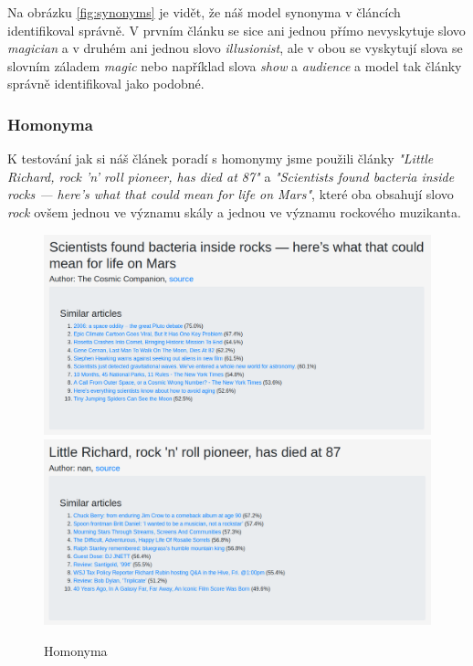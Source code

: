 \documentclass[11pt]{scrartcl} %
\begin{document}
\bigskip

Na obrázku \ref{fig:synonyms} je vidět, že náš model synonyma v článcích identifikoval správně. V prvním článku se sice ani jednou přímo nevyskytuje slovo \emph{magician} a v druhém ani jednou slovo \emph{illusionist}, ale v obou se vyskytují slova se slovním záladem \emph{magic} nebo například slova \emph{show} a \emph{audience} a model tak články správně identifikoval jako podobné.

\subsubsection{Homonyma}

K testování jak si náš článek poradí s homonymy jsme použili články \emph{"Little Richard, rock 'n' roll pioneer, has died at 87"} a \emph{"Scientists found bacteria inside rocks — here’s what that could mean for life on Mars"}, které oba obsahují slovo \emph{rock} ovšem jednou ve významu skály a jednou ve významu rockového muzikanta.

\begin{figure}[h] %
	\centering
	\includegraphics[width=0.8\columnwidth]{images/homonyms_0.png}
	\includegraphics[width=0.8\columnwidth]{images/homonyms_1.png}
	\caption{Homonyma}
	\label{fig:homonyms}
\end{figure}

\bigskip
\end{document}
